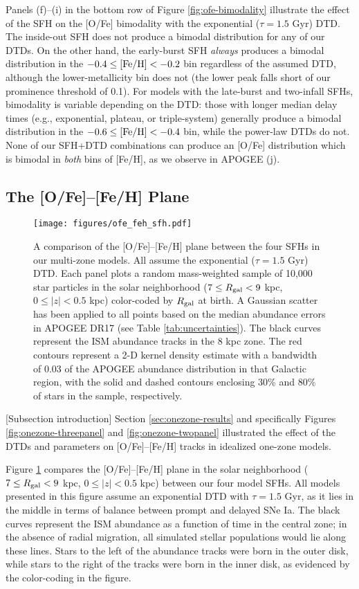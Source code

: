 \documentclass[twocolumn,twocolappendix,linenumbers,trackchanges]{aastex631}
\begin{document}
Panels (f)--(i) in the bottom row of Figure \ref{fig:ofe-bimodality} illustrate the effect of the SFH on the [O/Fe] bimodality with the exponential ($\tau=1.5$ Gyr) DTD. The inside-out SFH does not produce a bimodal distribution for any of our DTDs. On the other hand, the early-burst SFH {\it always} produces a bimodal distribution in the $-0.4\leq{\rm [Fe/H]}<-0.2$ bin regardless of the assumed DTD, although the lower-metallicity bin does not (the lower peak falls short of our prominence threshold of 0.1). For models with the late-burst and two-infall SFHs, bimodality is variable depending on the DTD: those with longer median delay times (e.g., exponential, plateau, or triple-system) generally produce a bimodal distribution in the $-0.6\leq{\rm [Fe/H]}<-0.4$ bin, while the power-law DTDs do not. None of our SFH+DTD combinations can produce an [O/Fe] distribution which is bimodal in {\it both} bins of [Fe/H], as we observe in APOGEE (j).

\subsection{The [O/Fe]--[Fe/H] Plane}
\label{sec:ofe-feh}

\begin{figure}
    \centering
    \texttt{[image: figures/ofe\_feh\_sfh.pdf]}
    \caption{A comparison of the [O/Fe]--[Fe/H] plane between the four SFHs in our multi-zone models. All assume the exponential ($\tau=1.5$ Gyr) DTD. Each panel plots a random mass-weighted sample of 10,000 star particles in the solar neighborhood ($7\leq R_{\rm gal}<9$ kpc, $0\leq|z|<0.5$ kpc) color-coded by $R_{\rm gal}$ at birth. A Gaussian scatter has been applied to all points based on the median abundance errors in APOGEE DR17 (see Table \ref{tab:uncertainties}). The black curves represent the ISM abundance tracks in the 8 kpc zone. The red contours represent a 2-D kernel density estimate with a bandwidth of 0.03 of the APOGEE abundance distribution in that Galactic region, with the solid and dashed contours enclosing 30\% and 80\% of stars in the sample, respectively.}
    \label{fig:ofe-feh-sfh}
\end{figure}

[Subsection introduction]
Section \ref{sec:onezone-results} and specifically Figures \ref{fig:onezone-threepanel} and \ref{fig:onezone-twopanel} illustrated the effect of the DTDs and parameters on [O/Fe]--[Fe/H] tracks in idealized one-zone models.

Figure \ref{fig:ofe-feh-sfh} compares the [O/Fe]--[Fe/H] plane in the solar neighborhood ($7\leq R_{\rm gal}<9$ kpc, $0\leq|z|<0.5$ kpc) between our four model SFHs. All models presented in this figure assume an exponential DTD with $\tau=1.5$ Gyr, as it lies in the middle in terms of balance between prompt and delayed SNe Ia. The black curves represent the ISM abundance as a function of time in the central zone; in the absence of radial migration, all simulated stellar populations would lie along these lines. Stars to the left of the abundance tracks were born in the outer disk, while stars to the right of the tracks were born in the inner disk, as evidenced by the color-coding in the figure.
\end{document}
